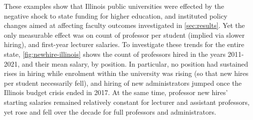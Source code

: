 These examples show that Illinois public universities were effected by the negative shock to state funding for higher education, and instituted policy changes aimed at affecting faculty outcomes investigated in \autoref{sec:results}.
Yet the only measurable effect was on count of professor per student (implied via slower hiring), and first-year lecturer salaries.
To investigate these trends for the entire state, \autoref{fig:newhire-illinois} shows the count of professors hired in the years 2011-2021, and their mean salary, by position.
In particular, no position had sustained rises in hiring while enrolment within the university was rising (so that new hires per student necessarily fell), and hiring of new administrators jumped once the Illinois budget crisis ended in 2017.
At the same time, professor new hires' starting salaries remained relatively constant for lecturer and assistant professors, yet rose and fell over the decade for full professors and administrators.
